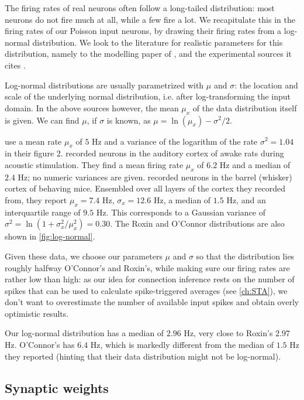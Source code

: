 The firing rates of real neurons often follow a long-tailed distribution: most neurons do not fire much at all, while a few fire a lot. We recapitulate this in the firing rates of our Poisson input neurons, by drawing their firing rates from a log-normal distribution. We look to the literature for realistic parameters for this distribution, namely to the modelling paper of , and the experimental sources it cites \cite{Hromadka2008SparseRepresentationSounds,OConnor2010NeuralActivityBarrel}.

Log-normal distributions are usually parametrized with $μ$ and $σ$: the location and scale of the underlying normal distribution, i.e. after log-transforming the input domain. In the above sources however, the mean $μ_x$ of the data distribution itself is given. We can find $μ$, if $σ$ is known, as $μ = \ln(μ_x) - σ^2 / 2$.

 use a mean rate $μ_x$ of $5$ Hz and a variance of the logarithm of the rate $σ^2 = 1.04$ in their figure 2.  recorded neurons in the auditory cortex of awake rats during acoustic stimulation. They find a mean firing rate $μ_x$ of $6.2$ Hz and a median of $2.4$ Hz; no numeric variances are given.  recorded neurons in the barrel (whisker) cortex of behaving mice. Ensembled over all layers of the cortex they recorded from, they report $μ_x = 7.4$ Hz, $σ_x = 12.6$ Hz, a median of $1.5$ Hz, and an interquartile range of $9.5$ Hz. This corresponds to a Gaussian variance of $σ^2 = \ln(1 + σ_x^2 / μ_x^2) = 0.30$. The Roxin and O'Connor distributions are also shown in \cref{fig:log-normal}.

Given these data, we choose our parameters $μ$ and $σ$ so that the distribution lies roughly halfway O'Connor's and Roxin's, while making sure our firing rates are rather low than high: as our idea for connection inference rests on the number of spikes that can be used to calculate spike-triggered averages (see \cref{ch:STA}), we don't want to overestimate the number of available input spikes and obtain overly optimistic results.

Our log-normal distribution has a median of $2.96$ Hz, very close to Roxin's $2.97$ Hz. O'Connor's has $6.4$ Hz, which is markedly different from the median of $1.5$ Hz they reported (hinting that their data distribution might not be log-normal).

\subsection{Synaptic weights}
\label{sec:synaptic_weights}

